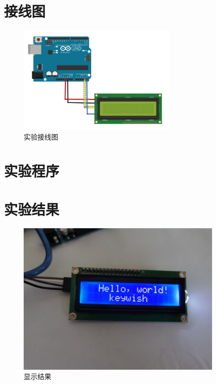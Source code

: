\documentclass[UTF8, oneside]{ctexbook}
\begin{document}
\section{接线图}
\begin{figure}[h]
    \centering
    \includegraphics[width=0.7\textwidth]{./result/sensor/3/lines.png}
    \caption{实验接线图}
    \label{s3_line}
\end{figure}

\section{实验程序}


\newpage
\section{实验结果}

\begin{figure}[h]
    \centering
    \includegraphics[width=0.9\textwidth]{./result/sensor/3/result.jpg}
    \caption{显示结果}
    \label{s3_1}
\end{figure}
\end{document}

